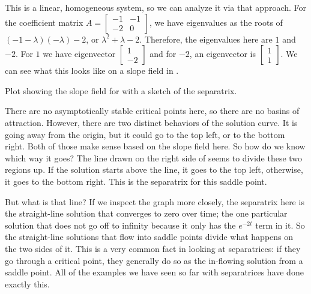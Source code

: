 \documentclass{ximera}
\begin{document}
\begin{exampleSol}
    This is a linear, homogeneous system, so we can analyze it via that approach. For the coefficient matrix $A = \left[ \begin{smallmatrix} -1 & -1 \\ -2 & 0 \end{smallmatrix} \right]$, we have eigenvalues as the roots of $(-1-\lambda)(-\lambda) - 2$, or $\lambda^2 + \lambda - 2$. Therefore, the eigenvalues here are $1$ and $-2$. For $1$ we have eigenvector $\left[ \begin{smallmatrix} 1 \\ -2 \end{smallmatrix}\right]$ and for $-2$, an eigenvector is $\left[ \begin{smallmatrix} 1 \\ 1 \end{smallmatrix}\right]$. We can see what this looks like on a slope field in .
    
    
    \begin{mywrapfig}{3.3in}
        \capstart
        \caption{Plot showing the slope field for  with a sketch of the separatrix. \label{fig:SepPlot}}
    \end{mywrapfig}
    
    There are no asymptotically stable critical points here, so there are no basins of attraction. However, there are two distinct behaviors of the solution curve. It is going away from the origin, but it could go to the top left, or to the bottom right. Both of those make sense based on the slope field here. So how do we know which way it goes? The line drawn on the right side of  seems to divide these two regions up. If the solution starts above the line, it goes to the top left, otherwise, it goes to the bottom right. This is the separatrix for this saddle point.
    
    But what is that line? If we inspect the graph more closely, the separatrix here is the straight-line solution that converges to zero over time; the one particular solution that does not go off to infinity because it only has the $e^{-2t}$ term in it. So the straight-line solutions that flow into saddle points divide what happens on the two sides of it. This is a very common fact in looking at separatrices: if they go through a critical point, they generally do so as the in-flowing solution from a saddle point. All of the examples we have seen so far with separatrices have done exactly this.
\end{exampleSol}
\end{document}
